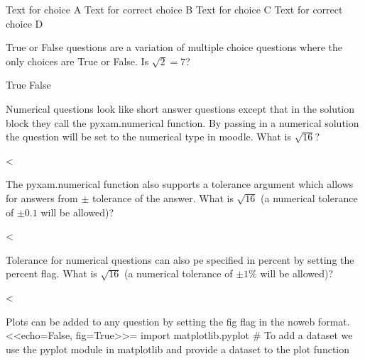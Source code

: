 \documentclass[12pt]{exam}
\begin{document}
\begin{questions}
                \begin{choices}
                    \choice Text for choice A
                    \CorrectChoice Text for correct choice B
                    \choice Text for choice C
                    \CorrectChoice Text for correct choice D
                \end{choices}
                True or False questions are a variation of multiple choice questions where the only choices are True or
                False. Is $\sqrt{2}=7$?
                \begin{choices}
                    \choice True
                    \CorrectChoice False
                \end{choices}
                Numerical questions look like short answer questions except that in the solution block they call the
                pyxam.numerical function. By passing in a numerical solution the question will be set to the numerical
                type in moodle. What is $\sqrt{16}$?
                \begin{solution}
                    <%
                \end{solution}
                The pyxam.numerical function also supports a tolerance argument which allows for answers from $\pm$
                tolerance of the answer. What is $\sqrt{16}$ (a numerical tolerance of $\pm 0.1$ will be allowed)?
                \begin{solution}
                    <%
                \end{solution}
                Tolerance for numerical questions can also pe specified in percent by setting the percent flag. What is 
                $\sqrt{16}$ (a numerical tolerance of $\pm 1\%$ will be allowed)?
                \begin{solution}
                    <%
                \end{solution}
                Plots can be added to any question by setting the fig flag in the noweb format.
<<echo=False, fig=True>>=
import matplotlib.pyplot
# To add a dataset we use the pyplot module in matplotlib and provide a dataset to the plot function

\end{questions}
\end{document}
